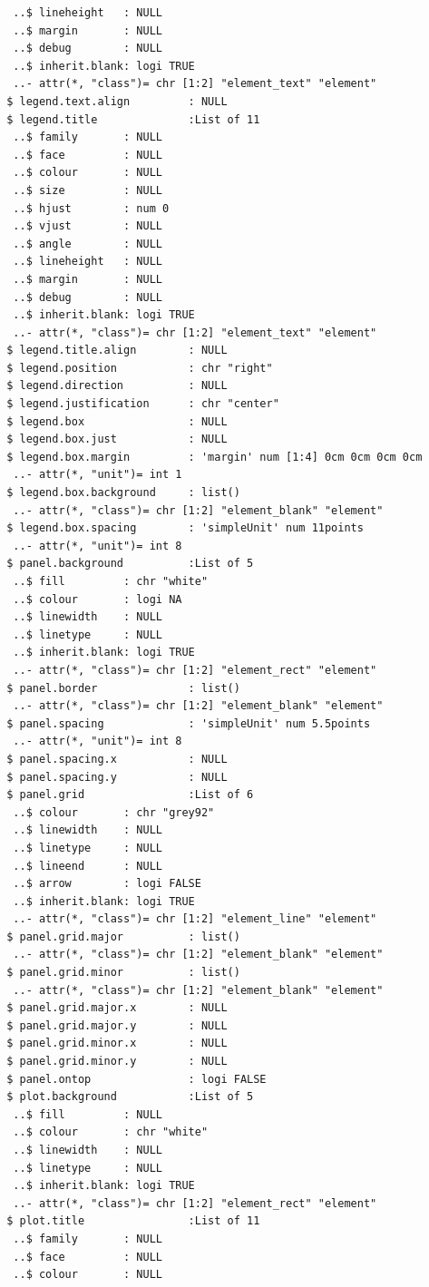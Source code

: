 \documentclass[
  letterpaper,
  DIV=11,
  numbers=noendperiod]{scrartcl}
\begin{document}
\begin{verbatim}
  ..$ lineheight   : NULL
  ..$ margin       : NULL
  ..$ debug        : NULL
  ..$ inherit.blank: logi TRUE
  ..- attr(*, "class")= chr [1:2] "element_text" "element"
 $ legend.text.align         : NULL
 $ legend.title              :List of 11
  ..$ family       : NULL
  ..$ face         : NULL
  ..$ colour       : NULL
  ..$ size         : NULL
  ..$ hjust        : num 0
  ..$ vjust        : NULL
  ..$ angle        : NULL
  ..$ lineheight   : NULL
  ..$ margin       : NULL
  ..$ debug        : NULL
  ..$ inherit.blank: logi TRUE
  ..- attr(*, "class")= chr [1:2] "element_text" "element"
 $ legend.title.align        : NULL
 $ legend.position           : chr "right"
 $ legend.direction          : NULL
 $ legend.justification      : chr "center"
 $ legend.box                : NULL
 $ legend.box.just           : NULL
 $ legend.box.margin         : 'margin' num [1:4] 0cm 0cm 0cm 0cm
  ..- attr(*, "unit")= int 1
 $ legend.box.background     : list()
  ..- attr(*, "class")= chr [1:2] "element_blank" "element"
 $ legend.box.spacing        : 'simpleUnit' num 11points
  ..- attr(*, "unit")= int 8
 $ panel.background          :List of 5
  ..$ fill         : chr "white"
  ..$ colour       : logi NA
  ..$ linewidth    : NULL
  ..$ linetype     : NULL
  ..$ inherit.blank: logi TRUE
  ..- attr(*, "class")= chr [1:2] "element_rect" "element"
 $ panel.border              : list()
  ..- attr(*, "class")= chr [1:2] "element_blank" "element"
 $ panel.spacing             : 'simpleUnit' num 5.5points
  ..- attr(*, "unit")= int 8
 $ panel.spacing.x           : NULL
 $ panel.spacing.y           : NULL
 $ panel.grid                :List of 6
  ..$ colour       : chr "grey92"
  ..$ linewidth    : NULL
  ..$ linetype     : NULL
  ..$ lineend      : NULL
  ..$ arrow        : logi FALSE
  ..$ inherit.blank: logi TRUE
  ..- attr(*, "class")= chr [1:2] "element_line" "element"
 $ panel.grid.major          : list()
  ..- attr(*, "class")= chr [1:2] "element_blank" "element"
 $ panel.grid.minor          : list()
  ..- attr(*, "class")= chr [1:2] "element_blank" "element"
 $ panel.grid.major.x        : NULL
 $ panel.grid.major.y        : NULL
 $ panel.grid.minor.x        : NULL
 $ panel.grid.minor.y        : NULL
 $ panel.ontop               : logi FALSE
 $ plot.background           :List of 5
  ..$ fill         : NULL
  ..$ colour       : chr "white"
  ..$ linewidth    : NULL
  ..$ linetype     : NULL
  ..$ inherit.blank: logi TRUE
  ..- attr(*, "class")= chr [1:2] "element_rect" "element"
 $ plot.title                :List of 11
  ..$ family       : NULL
  ..$ face         : NULL
  ..$ colour       : NULL

\end{verbatim}
\end{document}
